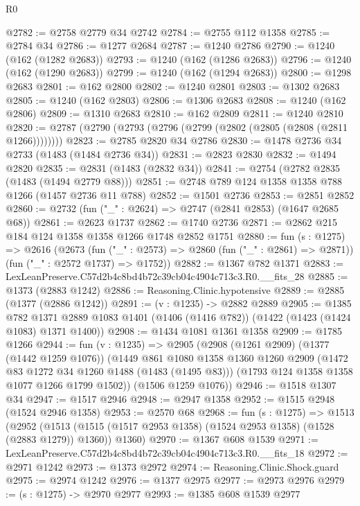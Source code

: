 \begin{lexlean}{R0}
\begin{coremodule}
@2782 := @2758 @2779 @34 @2742
@2784 := @2755 @112 @1358
@2785 := @2784 @34
@2786 := @1277 @2684
@2787 := @1240 @2786
@2790 := @1240 (@162 (@1282 @2683))
@2793 := @1240 (@162 (@1286 @2683))
@2796 := @1240 (@162 (@1290 @2683))
@2799 := @1240 (@162 (@1294 @2683))
@2800 := @1298 @2683
@2801 := @162 @2800
@2802 := @1240 @2801
@2803 := @1302 @2683
@2805 := @1240 (@162 @2803)
@2806 := @1306 @2683
@2808 := @1240 (@162 @2806)
@2809 := @1310 @2683
@2810 := @162 @2809
@2811 := @1240 @2810
@2820 := @2787 (@2790 (@2793 (@2796 (@2799 (@2802 (@2805 (@2808 (@2811 @1266))))))))
@2823 := @2785 @2820 @34 @2786
@2830 := @1478 @2736 @34 @2733 (@1483 (@1484 @2736 @34))
@2831 := @2823 @2830
@2832 := @1494 @2820
@2835 := @2831 (@1483 (@2832 @34))
@2841 := @2754 (@2782 @2835 (@1483 (@1494 @2779 @88)))
@2851 := @2748 @789 @124 @1358 @1358 @788 @1266 (@1457 @2736 @11 @788)
@2852 := @1501 @2736
@2853 := @2851 @2852
@2860 := @2732 (fun ("_" : @2624) => @2747 (@2841 @2853) (@1647 @2685 @68))
@2861 := @2623 @1737
@2862 := @1740 @2736
@2871 := @2862 @215 @184 @124 @1358 @1358 @1266 @1748 @2852 @1751
@2880 := fun (s : @1275) =>
  @2616
    (@2673
      (fun ("_" : @2573) => @2860 (fun ("_" : @2861) => @2871))
      (fun ("_" : @2572 @1737) => @1752))
@2882 := @1367 @782 @1371
@2883 := LexLeanPreserve.C57d2b4c8bd4b72c39cb04c4904c713c3.R0.__fits_28
@2885 := @1373 (@2883 @1242)
@2886 := Reasoning.Clinic.hypotensive
@2889 := @2885 (@1377 (@2886 @1242))
@2891 := (v : @1235) -> @2882 @2889
@2905 := @1385
    @782
    @1371
    @2889
    @1083
    @1401
    (@1406 (@1416 @782))
    (@1422 (@1423 (@1424 @1083) @1371 @1400))
@2908 := @1434 @1081 @1361 @1358
@2909 := @1785 @1266
@2944 := fun (v : @1235) =>
  @2905
    (@2908
      (@1261 @2909)
      (@1377 (@1442 @1259 @1076))
      (@1449
        @861
        @1080
        @1358
        @1360
        @1260
        @2909
        (@1472 @83 @1272 @34 @1260 @1488 (@1483 (@1495 @83)))
        (@1793 @124 @1358 @1358 @1077 @1266 @1799 @1502))
      (@1506 @1259 @1076))
@2946 := @1518 @1307 @34
@2947 := @1517 @2946
@2948 := @2947 @1358
@2952 := @1515 @2948 (@1524 @2946 @1358)
@2953 := @2570 @68
@2968 := fun (s : @1275) =>
  @1513
    (@2952
      (@1513 (@1515 (@1517 @2953 @1358) (@1524 @2953 @1358) (@1528 (@2883 @1279)) @1360))
      @1360)
@2970 := @1367 @608 @1539
@2971 := LexLeanPreserve.C57d2b4c8bd4b72c39cb04c4904c713c3.R0.__fits_18
@2972 := @2971 @1242
@2973 := @1373 @2972
@2974 := Reasoning.Clinic.Shock.guard
@2975 := @2974 @1242
@2976 := @1377 @2975
@2977 := @2973 @2976
@2979 := (s : @1275) -> @2970 @2977
@2993 := @1385
    @608
    @1539
    @2977

\end{coremodule}
\end{lexlean}
